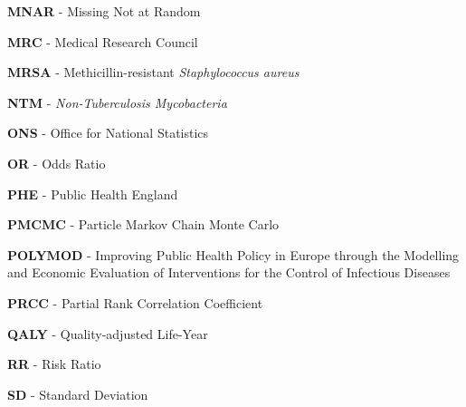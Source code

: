 \documentclass[11pt,twoside]{bristolthesis}
\begin{document}
\begin{acronyms}
      \par
      
      \textbf{MNAR} - Missing Not at Random
      
      \par
      
      \textbf{MRC} - Medical Research Council
      
      \par
      
      \textbf{MRSA} - Methicillin-resistant \emph{Staphylococcus aureus}
      
      \par
      
      \textbf{NTM} - \emph{Non-Tuberculosis Mycobacteria}
      
      \par
      
      \textbf{ONS} - Office for National Statistics
      
      \par
      
      \textbf{OR} - Odds Ratio
      
      \par
      
      \textbf{PHE} - Public Health England
      
      \par
      
      \textbf{PMCMC} - Particle Markov Chain Monte Carlo
      
      \par
      
      \textbf{POLYMOD} - Improving Public Health Policy in Europe through the Modelling and Economic Evaluation of Interventions for the Control of Infectious Diseases
      
      \par
      
      \textbf{PRCC} - Partial Rank Correlation Coefficient
      
      \par
      
      \textbf{QALY} - Quality-adjusted Life-Year
      
      \par
      
      \textbf{RR} - Risk Ratio
      
      \par
      
      \textbf{SD} - Standard Deviation
      

\end{acronyms}
\end{document}
